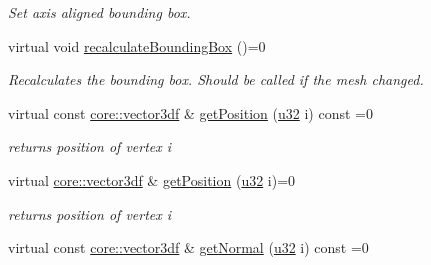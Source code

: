 \begin{DoxyCompactItemize}
\begin{DoxyCompactList}\small\item\em Set axis aligned bounding box. \end{DoxyCompactList}\item 
\mbox{\label{classirr_1_1scene_1_1IMeshBuffer_a161877fc3afe29a816440db12a71785d}} 
virtual void \hyperlink{classirr_1_1scene_1_1IMeshBuffer_a161877fc3afe29a816440db12a71785d}{recalculate\+Bounding\+Box} ()=0
\begin{DoxyCompactList}\small\item\em Recalculates the bounding box. Should be called if the mesh changed. \end{DoxyCompactList}\item 
\mbox{\label{classirr_1_1scene_1_1IMeshBuffer_a79ca051edc0ece69057fda7b4fe1e155}} 
virtual const \hyperlink{namespaceirr_1_1core_ae6e2b2a6c552833ebbd5b7463d03586b}{core\+::vector3df} \& \hyperlink{classirr_1_1scene_1_1IMeshBuffer_a79ca051edc0ece69057fda7b4fe1e155}{get\+Position} (\hyperlink{namespaceirr_a0416a53257075833e7002efd0a18e804}{u32} i) const =0
\begin{DoxyCompactList}\small\item\em returns position of vertex i \end{DoxyCompactList}\item 
\mbox{\label{classirr_1_1scene_1_1IMeshBuffer_a66cbd49a55fd0bfffffced149902bba3}} 
virtual \hyperlink{namespaceirr_1_1core_ae6e2b2a6c552833ebbd5b7463d03586b}{core\+::vector3df} \& \hyperlink{classirr_1_1scene_1_1IMeshBuffer_a66cbd49a55fd0bfffffced149902bba3}{get\+Position} (\hyperlink{namespaceirr_a0416a53257075833e7002efd0a18e804}{u32} i)=0
\begin{DoxyCompactList}\small\item\em returns position of vertex i \end{DoxyCompactList}\item 
\mbox{\label{classirr_1_1scene_1_1IMeshBuffer_a067c78a395736da9ace45e367cb7e2e5}} 
virtual const \hyperlink{namespaceirr_1_1core_ae6e2b2a6c552833ebbd5b7463d03586b}{core\+::vector3df} \& \hyperlink{classirr_1_1scene_1_1IMeshBuffer_a067c78a395736da9ace45e367cb7e2e5}{get\+Normal} (\hyperlink{namespaceirr_a0416a53257075833e7002efd0a18e804}{u32} i) const =0

\end{DoxyCompactItemize}
